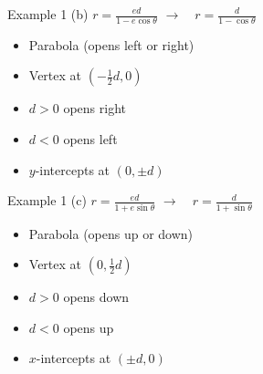 \documentclass[t,usenames,dvipsnames]{beamer}
\begin{document}
\begin{frame}{Example 1}
(b) \quad $r = \frac{ed}{1-e\cos\theta}$        \pause    \quad $\longrightarrow \quad r = \frac{d}{1-\cos\theta}$ \newline\\ \pause
    \begin{itemize}
        \item Parabola (opens left or right)  \pause  \newline\\
        \item Vertex at $\left(-\frac{1}{2}d, 0\right)$ \pause \newline\\
        \item $d > 0$ opens right    \pause  \newline\\
        \item $d < 0$ opens left   \pause  \newline\\
        \item $y$-intercepts at $\left(0, \pm d\right)$
    \end{itemize}
\end{frame}

\begin{frame}{Example 1}
(c) \quad $r = \frac{ed}{1+e\sin\theta}$    \pause    \quad $\longrightarrow \quad r = \frac{d}{1+\sin\theta}$ \newline\\ \pause
    \begin{itemize}
        \item Parabola (opens up or down)  \pause  \newline\\
        \item Vertex at $\left(0, \frac{1}{2}d\right)$ \pause \newline\\
        \item $d > 0$ opens down    \pause  \newline\\
        \item $d < 0$ opens up   \pause  \newline\\
        \item $x$-intercepts at $\left(\pm d, 0\right)$
    \end{itemize}
\end{frame}
\end{document}
